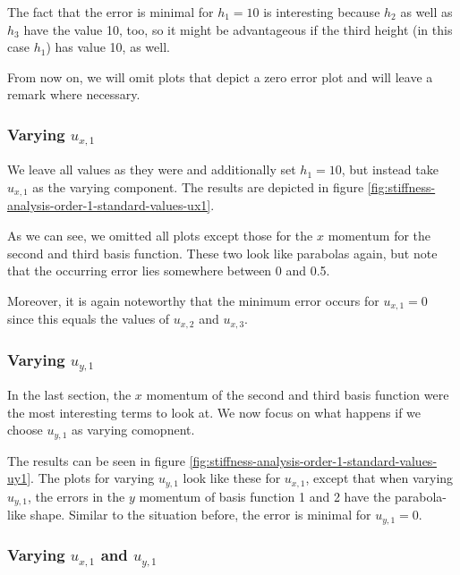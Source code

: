 \documentclass{article}
\begin{document}
The fact that the error is minimal for $h_1=10$ is interesting because $h_2$ as well as $h_3$ have the value 10, too, so it might be advantageous if the third height (in this case $h_1$) has value 10, as well.

From now on, we will omit plots that depict a zero error plot and will leave a remark where necessary.

\subsubsection{\texorpdfstring{Varying $u_{x,1}$}{Varying ux1}}

We leave all values as they were and additionally set $h_1=10$, but instead take $u_{x,1}$ as the varying component. The results are depicted in figure \ref{fig:stiffness-analysis-order-1-standard-values-ux1}.



As we can see, we omitted all plots except those for the $x$ momentum for the second and third basis function. These two look like parabolas again, but note that the occurring error lies somewhere between 0 and 0.5.

Moreover, it is again noteworthy that the minimum error occurs for $u_{x,1}=0$ since this equals the values of $u_{x,2}$ and $u_{x,3}$.

\subsubsection{\texorpdfstring{Varying $u_{y,1}$}{Varying uy1}}

In the last section, the $x$ momentum of the second and third basis function were the most interesting terms to look at. We now focus on what happens if we choose $u_{y,1}$ as varying comopnent.



The results can be seen in figure \ref{fig:stiffness-analysis-order-1-standard-values-uy1}. The plots for varying $u_{y,1}$ look like these for $u_{x,1}$, except that when varying $u_{y,1}$, the errors in the $y$ momentum of basis function 1 and 2 have the parabola-like shape. Similar to the situation before, the error is minimal for $u_{y,1}=0$.

\subsubsection{\texorpdfstring{Varying $u_{x,1}$ and $u_{y,1}$}{Varying ux1 and uy1}}
\end{document}
